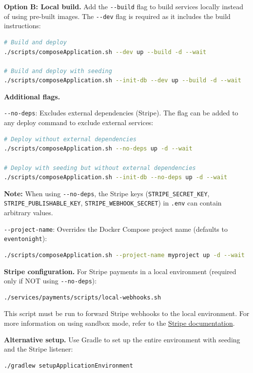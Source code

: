 \noindent\textbf{Option B: Local build.}
Add the \texttt{-{}-build} flag to build services locally instead of using pre-built images. The \texttt{-{}-dev} flag is required as it includes the build instructions:
\begin{lstlisting}[language=bash]
# Build and deploy
./scripts/composeApplication.sh --dev up --build -d --wait

# Build and deploy with seeding
./scripts/composeApplication.sh --init-db --dev up --build -d --wait
\end{lstlisting}

\noindent\textbf{Additional flags.}\par\noindent
\texttt{-{}-no-deps}: Excludes external dependencies (Stripe). The flag can be added to any deploy command to exclude external services:
\begin{lstlisting}[language=bash]
# Deploy without external dependencies
./scripts/composeApplication.sh --no-deps up -d --wait

# Deploy with seeding but without external dependencies
./scripts/composeApplication.sh --init-db --no-deps up -d --wait
\end{lstlisting}

\noindent \textbf{Note:} When using \texttt{-{}-no-deps}, the Stripe keys (\texttt{STRIPE\_SECRET\_KEY}, \texttt{STRIPE\_PUBLISHABLE\_KEY}, \texttt{STRIPE\_WEBHOOK\_SECRET}) in \texttt{.env} can contain arbitrary values.

\noindent\texttt{-{}-project-name}: Overrides the Docker Compose project name (defaults to \texttt{eventonight}):
\begin{lstlisting}[language=bash]
./scripts/composeApplication.sh --project-name myproject up -d --wait
\end{lstlisting}

\noindent\textbf{Stripe configuration.}\label{par:stripe-config} For Stripe payments in a local environment (required only if NOT using \texttt{-{}-no-deps}):
\begin{lstlisting}[language=bash]
./services/payments/scripts/local-webhooks.sh
\end{lstlisting}

\noindent This script must be run to forward Stripe webhooks to the local environment. For more information on using sandbox mode, refer to the \href{https://docs.stripe.com/testing}{Stripe documentation}.

\noindent\textbf{Alternative setup.} Use Gradle to set up the entire environment with seeding and the Stripe listener:
\begin{lstlisting}[language=bash]
./gradlew setupApplicationEnvironment
\end{lstlisting}

